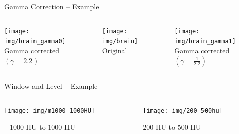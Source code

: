 \begin{frame}[c]{Gamma Correction -- Example}
    \begin{columns}[onlytextwidth]
        \begin{column}{0.30\textwidth}\centering
            \texttt{[image: img/brain\_gamma0]}\\ Gamma
            corrected $(\gamma=2.2)$
        \end{column}
        \begin{column}{0.30\textwidth}\centering
            \texttt{[image: img/brain]}\\ Original
        \end{column}
        \begin{column}{0.30\textwidth}\centering
            \texttt{[image: img/brain\_gamma1]}\\ Gamma
            corrected $(\gamma=\frac{1}{2.2})$
        \end{column}
    \end{columns}
\end{frame}

\begin{frame}{Window and Level -- Example}
    \begin{columns}[T, onlytextwidth]
        \begin{column}{0.5\textwidth}\centering
            \texttt{[image: img/m1000-1000HU]}

            $-1000$ HU to $1000$ HU
        \end{column}
        \begin{column}{0.5\textwidth}\centering
            \texttt{[image: img/200-500hu]}

            $200$ HU to $500$ HU
        \end{column}
    \end{columns}
\end{frame}

